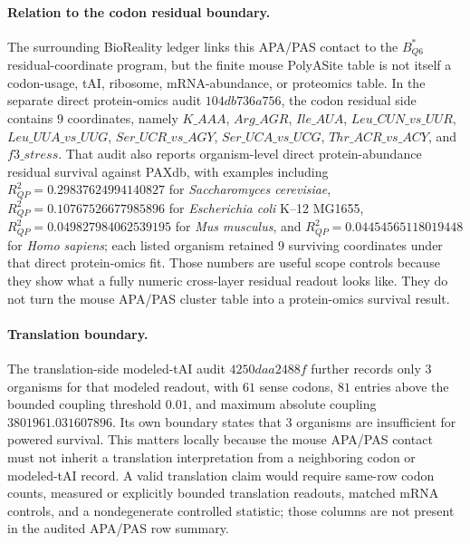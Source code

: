 \paragraph{Relation to the codon residual boundary.}
The surrounding BioReality ledger links this APA/PAS contact to the $B^{*}_{Q6}$ residual-coordinate program, but the finite mouse PolyASite table is not itself a codon-usage, tAI, ribosome, mRNA-abundance, or proteomics table.  In the separate direct protein-omics audit $104db736a756$, the codon residual side contains $9$ coordinates, namely $K\_AAA$, $Arg\_AGR$, $Ile\_AUA$, $Leu\_CUN\_vs\_UUR$, $Leu\_UUA\_vs\_UUG$, $Ser\_UCR\_vs\_AGY$, $Ser\_UCA\_vs\_UCG$, $Thr\_ACR\_vs\_ACY$, and $f3\_stress$.  That audit also reports organism-level direct protein-abundance residual survival against PAXdb, with examples including $R^2_{QP}=0.29837624994140827$ for \emph{Saccharomyces cerevisiae}, $R^2_{QP}=0.10767526677985896$ for \emph{Escherichia coli} K--12 MG1655, $R^2_{QP}=0.049827984062539195$ for \emph{Mus musculus}, and $R^2_{QP}=0.04454565118019448$ for \emph{Homo sapiens}; each listed organism retained $9$ surviving coordinates under that direct protein-omics fit.  Those numbers are useful scope controls because they show what a fully numeric cross-layer residual readout looks like.  They do not turn the mouse APA/PAS cluster table into a protein-omics survival result.

\paragraph{Translation boundary.}
The translation-side modeled-tAI audit $4250daa2488f$ further records only $3$ organisms for that modeled readout, with $61$ sense codons, $81$ entries above the bounded coupling threshold $0.01$, and maximum absolute coupling $3801961.031607896$.  Its own boundary states that $3$ organisms are insufficient for powered survival.  This matters locally because the mouse APA/PAS contact must not inherit a translation interpretation from a neighboring codon or modeled-tAI record.  A valid translation claim would require same-row codon counts, measured or explicitly bounded translation readouts, matched mRNA controls, and a nondegenerate controlled statistic; those columns are not present in the audited APA/PAS row summary.

